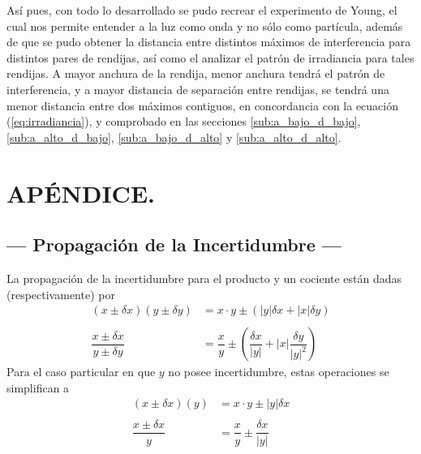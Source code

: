 \documentclass[12pt,a4paper]{article}
\begin{document}
Así pues, con todo lo desarrollado se pudo recrear el experimento de Young, el cual nos permite entender a la luz como onda y no sólo como partícula, además de que se pudo obtener la distancia entre distintos máximos de interferencia para distintos pares de rendijas, así como el analizar el patrón de irradiancia para tales rendijas. A mayor anchura de la rendija, menor anchura tendrá el patrón de interferencia, y a mayor distancia de separación entre rendijas, se tendrá una menor distancia entre dos máximos contiguos, en concordancia con la ecuación (\ref{eq:irradiancia}), y comprobado en las secciones \ref{sub:a_bajo_d_bajo}, \ref{sub:a_alto_d_bajo}, \ref{sub:a_bajo_d_alto} y \ref{sub:a_alto_d_alto}. \\[2mm]




\section{APÉNDICE.} %
\subsection{--- Propagación de la Incertidumbre ---}
	La propagación de la incertidumbre para el producto y un cociente están dadas (respectivamente) por
	\begin{align*}
		(x\pm\delta x)(y\pm\delta y)&=x\cdot y\pm\left(|y|\delta x+|x|\delta y \right)\\\\
		\dfrac{x\pm\delta x}{y\pm\delta y}&=\dfrac{x}{y}\pm\left(\dfrac{\delta x}{|y|}+|x|\dfrac{\delta y}{|y|^2}\right)
	\end{align*}
	Para el caso particular en que $ y $ no posee incertidumbre, estas operaciones se simplifican a
	\begin{align*}
		(x\pm\delta x)(y)&=x\cdot y\pm|y|\delta x\\\\
		\dfrac{x\pm\delta x}{y}&=\dfrac{x}{y}\pm\dfrac{\delta x}{|y|}
	\end{align*} 
\end{document}
